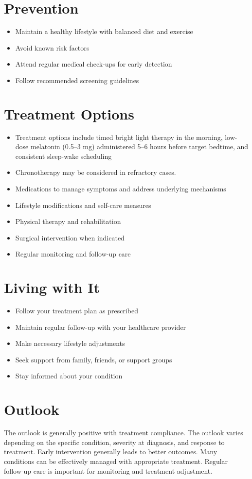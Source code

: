 \section{Prevention}
\begin{itemize}[noitemsep]
  \item Maintain a healthy lifestyle with balanced diet and exercise
  \item Avoid known risk factors
  \item Attend regular medical check-ups for early detection
  \item Follow recommended screening guidelines
\end{itemize}
\section{Treatment Options}
\begin{itemize}[noitemsep]
  \item Treatment options include timed bright light therapy in the morning, low-dose melatonin (0.5--3 mg) administered 5--6 hours before target bedtime, and consistent sleep-wake scheduling
  \item Chronotherapy may be considered in refractory cases.
  \item Medications to manage symptoms and address underlying mechanisms
  \item Lifestyle modifications and self-care measures
  \item Physical therapy and rehabilitation
  \item Surgical intervention when indicated
  \item Regular monitoring and follow-up care
\end{itemize}
\section{Living with It}
\begin{itemize}[noitemsep]
  \item Follow your treatment plan as prescribed
  \item Maintain regular follow-up with your healthcare provider
  \item Make necessary lifestyle adjustments
  \item Seek support from family, friends, or support groups
  \item Stay informed about your condition
\end{itemize}
\section{Outlook}
The outlook is generally positive with treatment compliance. The outlook varies depending on the specific condition, severity at diagnosis, and response to treatment. Early intervention generally leads to better outcomes. Many conditions can be effectively managed with appropriate treatment. Regular follow-up care is important for monitoring and treatment adjustment.
